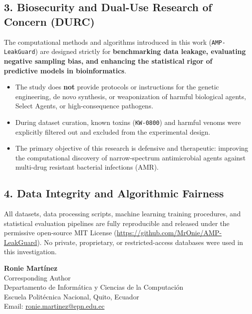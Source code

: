 \documentclass[11pt,a4paper]{article}
\begin{document}
\subsection*{3. Biosecurity and Dual-Use Research of Concern (DURC)}
The computational methods and algorithms introduced in this work (\texttt{AMP-LeakGuard}) are designed strictly for \textbf{benchmarking data leakage, evaluating negative sampling bias, and enhancing the statistical rigor of predictive models in bioinformatics}. 
\begin{itemize}
    \item The study does \textbf{not} provide protocols or instructions for the genetic engineering, de novo synthesis, or weaponization of harmful biological agents, Select Agents, or high-consequence pathogens.
    \item During dataset curation, known toxins (\texttt{KW-0800}) and harmful venoms were explicitly filtered out and excluded from the experimental design.
    \item The primary objective of this research is defensive and therapeutic: improving the computational discovery of narrow-spectrum antimicrobial agents against multi-drug resistant bacterial infections (AMR).
\end{itemize}

\subsection*{4. Data Integrity and Algorithmic Fairness}
All datasets, data processing scripts, machine learning training procedures, and statistical evaluation pipelines are fully reproducible and released under the permissive open-source MIT License (\url{https://github.com/MrOnie/AMP-LeakGuard}). No private, proprietary, or restricted-access databases were used in this investigation.

\vspace{1.0cm}

\noindent\textbf{Ronie Martínez}\\
Corresponding Author\\
Departamento de Informática y Ciencias de la Computación\\
Escuela Politécnica Nacional, Quito, Ecuador\\
Email: \href{mailto:ronie.martinez@epn.edu.ec}{ronie.martinez@epn.edu.ec}
\end{document}

